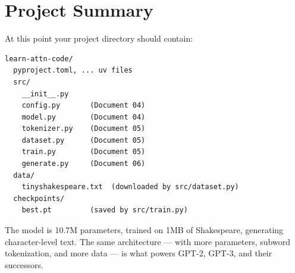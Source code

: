 \section{Project Summary}

At this point your project directory should contain:

\begin{verbatim}
learn-attn-code/
  pyproject.toml, ... uv files
  src/
    __init__.py
    config.py       (Document 04)
    model.py        (Document 04)
    tokenizer.py    (Document 05)
    dataset.py      (Document 05)
    train.py        (Document 05)
    generate.py     (Document 06)
  data/
    tinyshakespeare.txt  (downloaded by src/dataset.py)
  checkpoints/
    best.pt         (saved by src/train.py)
\end{verbatim}

The model is 10.7M parameters, trained on 1MB of Shakespeare, generating character-level text. The same architecture --- with more parameters, subword tokenization, and more data --- is what powers GPT-2, GPT-3, and their successors.


